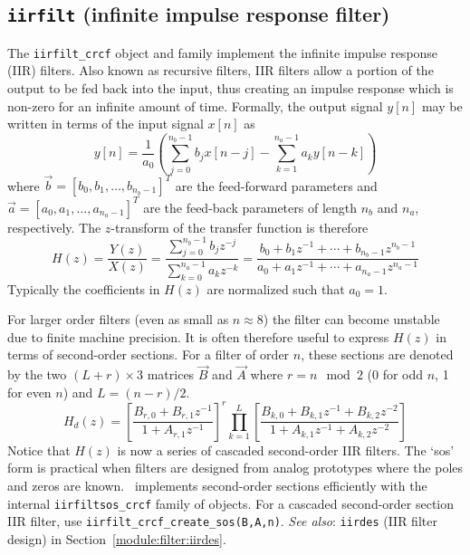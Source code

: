 \subsection{{\tt iirfilt} (infinite impulse response filter)}
\label{module:filter:iirfilt}
The {\tt iirfilt\_crcf} object and family implement the infinite impulse
response (IIR) filters.
Also known as recursive filters, IIR filters allow a portion of the output to
be fed back into the input, thus creating an impulse response which is
non-zero for an infinite amount of time.
Formally, the output signal $y[n]$ may be written in terms of the input signal
$x[n]$ as
%
\begin{equation}
\label{eqn:filter:iirfilt:y}
    y[n] = \frac{1}{a_0} \left(
           \sum_{j=0}^{n_b-1}{ b_j x[n-j] } -
           \sum_{k=1}^{n_a-1}{ a_k y[n-k] }
           \right)
\end{equation}
%
where $\vec{b} = [b_0,b_1,\ldots,b_{n_b-1}]^T$ are the feed-forward parameters
and   $\vec{a} = [a_0,a_1,\ldots,a_{n_a-1}]^T$ are the feed-back parameters
of length $n_b$ and $n_a$, respectively.
The $z$-transform of the transfer function is therefore
%
\begin{equation}
\label{eqn:filter:iirfilt:Hz}
    H(z) = \frac{Y(z)}{X(z)}
         = \frac{\sum\limits_{j=0}^{n_b-1}{b_j z^{-j}}}
                {\sum\limits_{k=0}^{n_a-1}{a_k z^{-k}}}
         = \frac{ b_0 + b_1 z^{-1} + \cdots + b_{n_b-1} z^{n_b-1}}
                { a_0 + a_1 z^{-1} + \cdots + a_{n_a-1} z^{n_a-1}}
\end{equation}
%
Typically the coefficients in $H(z)$ are normalized such that $a_0=1$.

For larger order filters (even as small as $n\approx 8$) the filter can become
unstable due to finite machine precision.
It is often therefore useful to express $H(z)$ in terms of second-order
sections.
For a filter of order $n$, these sections are denoted by the two
$(L+r)\times 3$ matrices $\vec{B}$ and $\vec{A}$
where $r=n \mod 2$ (0 for odd $n$, 1 for even $n$) and $L=(n-r)/2$.
%
\begin{equation}
\label{eqn:filter:iirfilt:Hdz}
    H_d(z) = 
             \left[
                \frac{B_{r,0} + B_{r,1}z^{-1}}
                     {1       + A_{r,1}z^{-1}}
             \right]^r
             \prod_{k=1}^{L} {\left[
                \frac{B_{k,0} + B_{k,1}z^{-1} + B_{k,2}z^{-2}}
                     {1       + A_{k,1}z^{-1} + A_{k,2}z^{-2}}
             \right]}
\end{equation}
%
Notice that $H(z)$ is now a series of cascaded second-order IIR filters.
The `sos' form is practical when filters are designed from analog prototypes
where the poles and zeros are known.
\liquid\ implements second-order sections efficiently with the internal
{\tt iirfiltsos\_crcf} family of objects.
For a cascaded second-order section IIR filter, use
{\tt iirfilt\_crcf\_create\_sos(B,A,n)}.
%
{\em See also}: {\tt iirdes} (IIR filter design) in
Section~\ref{module:filter:iirdes}.


